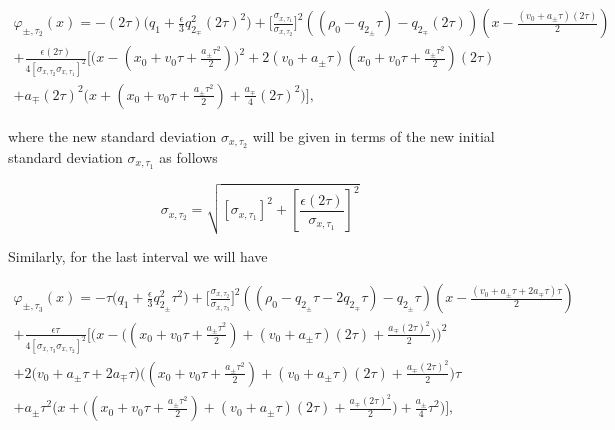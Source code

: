 \documentclass{article}
\begin{document}
\begin{multline}\label{quantum_phase_ignored_terms_simplified_t2}
\varphi_{\pm, \tau_{2}}(x) = -(2\tau) \bigg(q_{1} + \frac{\epsilon}{3} q_{2_{\mp}}^{2} (2\tau)^{2}\bigg) + \bigg[\frac{\sigma_{x, \tau_{1}}}{\sigma_{x, \tau_{2}}}\bigg]^{2}((\rho_{0} - q_{2_{\pm}} \tau)-q_{2_{\mp}} (2\tau))(x-\frac{(v_{0}+a_{\pm}\tau) (2\tau)}{2})\\ 
+\frac{\epsilon (2\tau)}{4 [\sigma_{x, \tau_{2}}\sigma_{x, \tau_{1}}]^{2}} \bigg[\bigg(x-(x_{0}+v_{0} \tau + \frac{a_{\pm}\tau^{2}}{2})\bigg)^{2}
+ 2(v_{0} + a_{\pm} \tau) (x_{0}+v_{0} \tau + \frac{a_{\pm}\tau^{2}}{2}) (2\tau) \\ 
+a_{\mp} (2\tau)^{2} \bigg(x+(x_{0}+v_{0} \tau + \frac{a_{\pm}\tau^{2}}{2})+ \frac{a_{\mp}}{4} (2\tau)^{2} \bigg)\bigg],
\end{multline}

where the new standard deviation $\sigma_{x, \tau_{2}}$ will be given in terms of the new initial standard deviation $\sigma_{x, \tau_{1}}$ as follows

\begin{equation}\label{sigma_x_t2}
\sigma_{x, \tau_{2}} = \sqrt{[\sigma_{x, \tau_{1}}]^{2} + \left[\frac{\epsilon (2\tau)}{\sigma_{x, \tau_{1}}} \right]^{2}}
\end{equation}

Similarly, for the last interval we will have

\begin{multline}\label{quantum_phase_ignored_terms_simplified_t3}
\varphi_{\pm, \tau_{3}}(x) = -\tau \bigg(q_{1} + \frac{\epsilon}{3} q_{2_{\pm}}^{2} \tau^{2}\bigg) + \bigg[\frac{\sigma_{x, \tau_{2}}}{\sigma_{x, \tau_{3}}}\bigg]^{2}((\rho_{0} - q_{2_{\pm}} \tau-2q_{2_{\mp}}\tau)-q_{2_{\pm}} \tau)(x-\frac{(v_{0}+a_{\pm}\tau + 2a_{\mp}\tau) \tau}{2}) \\
+ \frac{\epsilon \tau}{4 [\sigma_{x, \tau_{3}}\sigma_{x, \tau_{2}}]^{2}} \bigg[\bigg(x-\Big((x_{0}+v_{0} \tau + \frac{a_{\pm}\tau^{2}}{2}) + (v_{0}+a_{\pm}\tau)(2\tau) + \frac{a_{\mp}(2\tau)^{2}}{2}\Big)\bigg)^{2}\\
+ 2\bigg(v_{0} + a_{\pm} \tau + 2a_{\mp} \tau\bigg)\bigg((x_{0}+v_{0} \tau + \frac{a_{\pm}\tau^{2}}{2}) + (v_{0}+a_{\pm}\tau)(2\tau) + \frac{a_{\mp}(2\tau)^{2}}{2}\bigg) \tau\\
+a_{\pm} \tau^{2} \bigg(x+\Big((x_{0}+v_{0} \tau + \frac{a_{\pm}\tau^{2}}{2}) + (v_{0}+a_{\pm}\tau)(2\tau) + \frac{a_{\mp}(2\tau)^{2}}{2}\Big)+ \frac{a_{\pm}}{4} \tau^{2} \bigg)\bigg],
\end{multline}
\end{document}
